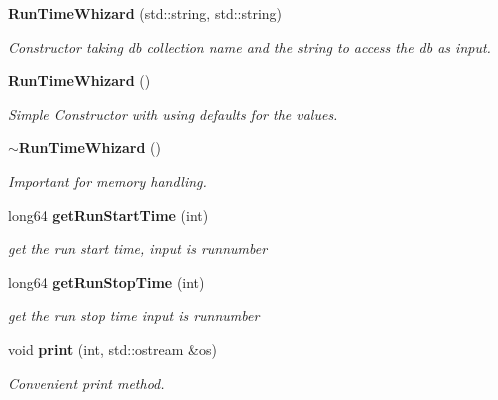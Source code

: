 \begin{DoxyCompactItemize}
\item 
{\bf Run\-Time\-Whizard} (std\-::string, std\-::string)\label{classCALICE_1_1RunTimeWhizard_a9f6df1c3d32cb94179623c5f0ef37b10}

\begin{DoxyCompactList}\small\item\em Constructor taking db collection name and the string to access the db as input. \end{DoxyCompactList}\item 
{\bf Run\-Time\-Whizard} ()\label{classCALICE_1_1RunTimeWhizard_ae510dd43ef03f8439200e9f43d00d4f2}

\begin{DoxyCompactList}\small\item\em Simple Constructor with using defaults for the values. \end{DoxyCompactList}\item 
{\bf $\sim$\-Run\-Time\-Whizard} ()\label{classCALICE_1_1RunTimeWhizard_a10803722fc623d7788f6f62ed4d040b9}

\begin{DoxyCompactList}\small\item\em Important for memory handling. \end{DoxyCompactList}\item 
long64 {\bf get\-Run\-Start\-Time} (int)\label{classCALICE_1_1RunTimeWhizard_a5d5c407669853902aa6ded39232b8aad}

\begin{DoxyCompactList}\small\item\em get the run start time, input is runnumber \end{DoxyCompactList}\item 
long64 {\bf get\-Run\-Stop\-Time} (int)\label{classCALICE_1_1RunTimeWhizard_a252ee65830f1acb99daea7cb2a1c9ec6}

\begin{DoxyCompactList}\small\item\em get the run stop time input is runnumber \end{DoxyCompactList}\item 
void {\bf print} (int, std\-::ostream \&os)\label{classCALICE_1_1RunTimeWhizard_a0cba359955aea2f3150d831125d6a89e}

\begin{DoxyCompactList}\small\item\em Convenient print method. \end{DoxyCompactList}\end{DoxyCompactItemize}
